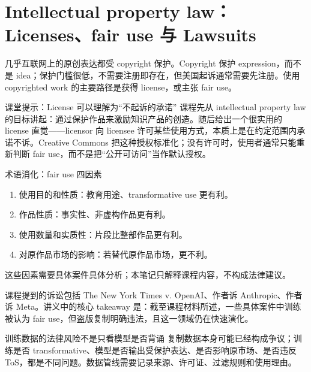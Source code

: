 \section{Intellectual property law：Licenses、fair use 与 Lawsuits}

几乎互联网上的原创表达都受 copyright 保护。Copyright 保护 expression，而不是 idea；保护门槛很低，不需要注册即存在，但美国起诉通常需要先注册。使用 copyrighted work 的主要路径是获得 license，或主张 fair use。

\begin{knowledgebox}{课堂提示：License 可以理解为“不起诉的承诺”}
课程先从 intellectual property law 的目标讲起：通过保护作品来激励知识产品的创造。随后给出一个很实用的 license 直觉——licensor 向 licensee 许可某些使用方式，本质上是在约定范围内承诺不诉。Creative Commons 把这种授权标准化；没有许可时，使用者通常只能重新判断 fair use，而不是把“公开可访问”当作默认授权。
\end{knowledgebox}

\begin{importantbox}{术语消化：fair use 四因素}
\begin{enumerate}
    \item 使用目的和性质：教育用途、transformative use 更有利。
    \item 作品性质：事实性、非虚构作品更有利。
    \item 使用数量和实质性：片段比整部作品更有利。
    \item 对原作品市场的影响：若替代原作品市场，更不利。
\end{enumerate}
这些因素需要具体案件具体分析；本笔记只解释课程内容，不构成法律建议。
\end{importantbox}

课程提到的诉讼包括 The New York Times v. OpenAI、作者诉 Anthropic、作者诉 Meta。讲义中的核心 takeaway 是：截至课程材料所述，一些具体案件中训练被认为 fair use，但盗版复制明确违法，且这一领域仍在快速演化。

\begin{warningbox}{训练数据的法律风险不是只看模型是否背诵}
复制数据本身可能已经构成争议；训练是否 transformative、模型是否输出受保护表达、是否影响原市场、是否违反 ToS，都是不同问题。数据管线需要记录来源、许可证、过滤规则和使用理由。
\end{warningbox}


